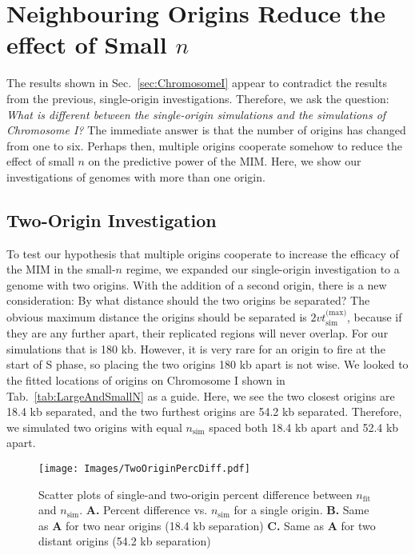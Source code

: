 	
	\section{Neighbouring Origins Reduce the effect of Small $n$}
	\label{sec: NearOrigins}
	
	The results shown in Sec.~\ref{sec:ChromosomeI} appear to contradict the results from the previous, single-origin investigations.
	Therefore, we ask the question: \emph{What is different between the single-origin simulations and the simulations of Chromosome I?}
	The immediate answer is that the number of origins has changed from one to six.
	Perhaps then, multiple origins cooperate somehow to reduce the effect of small $n$ on the predictive power of the MIM.
	Here, we show our investigations of genomes with more than one origin.
	
		\subsection{Two-Origin Investigation}
		\label{subsec:TwoOrigins}
		
		To test our hypothesis that multiple origins cooperate to increase the efficacy of the MIM in the small-$n$ regime, we expanded our single-origin investigation to a genome with two origins.
		With the addition of a second origin, there is a new consideration: By what distance should the two origins be separated?
		The obvious maximum distance the origins should be separated is $2vt_\text{sim}^\text{(max)}$, because if they are any further apart, their replicated regions will never overlap.
		For our simulations that is 180 kb.
		However, it is very rare for an origin to fire at the start of S phase, so placing the two origins 180 kb apart is not wise.
		We looked to the fitted locations of origins on Chromosome I shown in Tab.~\ref{tab:LargeAndSmallN} as a guide.
		Here, we see the two closest origins are 18.4 kb separated, and the two furthest origins are 54.2 kb separated.
		Therefore, we simulated two origins with equal $n_\text{sim}$ spaced both 18.4 kb apart and 52.4 kb apart.
		
	\begin{figure}[tbh]
		\begin{center}
			\texttt{[image: Images/TwoOriginPercDiff.pdf]}
		\end{center}
			\caption[Scatter Plots of Single-and Two-Origin Percent Difference]{\label{fig:TwoOrigins} 
				Scatter plots of single-and two-origin percent difference between $n_\text{fit}$ and $n_\text{sim}$.
				\textbf{A.} Percent difference vs. $n_\text{sim}$ for a single origin.
				\textbf{B.} Same as \textbf{A} for two near origins (18.4 kb separation)
				\textbf{C.} Same as \textbf{A} for two distant origins (54.2 kb separation)
			}
	\end{figure} 
		

